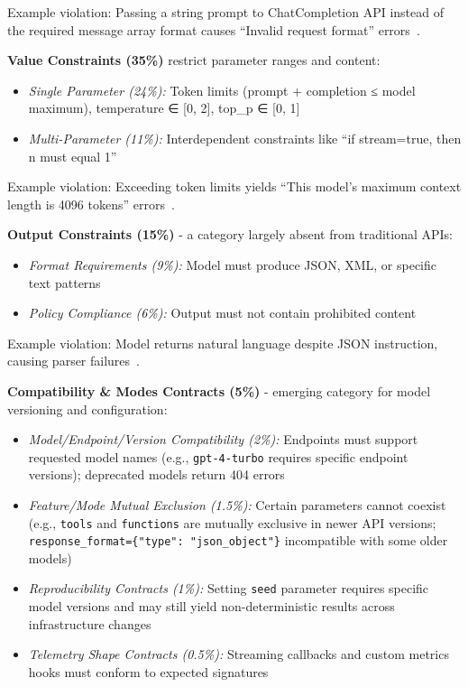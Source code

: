 \documentclass[11pt]{article}
\begin{document}
Example violation: Passing a string prompt to ChatCompletion API instead of the required message array format causes ``Invalid request format'' errors~\cite{stackoverflow75971578}.

\textbf{Value Constraints (35\%)} restrict parameter ranges and content:
\begin{itemize}
    \item \textit{Single Parameter (24\%):} Token limits (prompt + completion ≤ model maximum), temperature ∈ [0, 2], top\_p ∈ [0, 1]~\cite{githublangchain11405}
    \item \textit{Multi-Parameter (11\%):} Interdependent constraints like ``if stream=true, then n must equal 1''~\cite{stackoverflow76125712}
\end{itemize}

Example violation: Exceeding token limits yields ``This model's maximum context length is 4096 tokens'' errors~\cite{stackoverflow75396481}.

\textbf{Output Constraints (15\%)} - a category largely absent from traditional APIs:
\begin{itemize}
    \item \textit{Format Requirements (9\%):} Model must produce JSON, XML, or specific text patterns~\cite{guardrails2023}
    \item \textit{Policy Compliance (6\%):} Output must not contain prohibited content~\cite{openai2023moderation}
\end{itemize}

Example violation: Model returns natural language despite JSON instruction, causing parser failures~\cite{githublangchain22103}.

\textbf{Compatibility \& Modes Contracts (5\%)} - emerging category for model versioning and configuration:
\begin{itemize}
    \item \textit{Model/Endpoint/Version Compatibility (2\%):} Endpoints must support requested model names (e.g., \texttt{gpt-4-turbo} requires specific endpoint versions); deprecated models return 404 errors~\cite{openai2023docs}
    \item \textit{Feature/Mode Mutual Exclusion (1.5\%):} Certain parameters cannot coexist (e.g., \texttt{tools} and \texttt{functions} are mutually exclusive in newer API versions; \texttt{response\_format=\{"type": "json\_object"\}} incompatible with some older models)
    \item \textit{Reproducibility Contracts (1\%):} Setting \texttt{seed} parameter requires specific model versions and may still yield non-deterministic results across infrastructure changes~\cite{openai2023docs}
    \item \textit{Telemetry Shape Contracts (0.5\%):} Streaming callbacks and custom metrics hooks must conform to expected signatures
\end{itemize}
\end{document}
